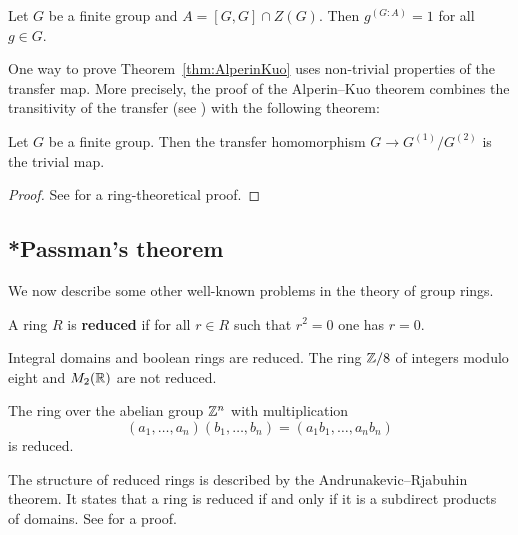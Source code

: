 
\begin{theorem}
\label{thm:AlperinKuo}
Let $G$ be a finite group and $A=[G,G]\cap Z(G)$. Then $g^{(G:A)}=1$ for all $g\in G$. 
\end{theorem}

One way to prove Theorem~\ref{thm:AlperinKuo} uses non-trivial properties of 
the transfer map. More precisely, the proof of the Alperin--Kuo theorem 
combines the transitivity of the transfer (see \cite[Theorem 10.8]{MR2426855}) 
with the following theorem:

\begin{theorem}
\label{thm:Furtwrangler}
    Let $G$ be a finite group. Then the transfer homomorphism 
    $G\to G^{(1)}/G^{(2)}$ is the trivial map. 
\end{theorem}

\begin{proof}
See \cite[Theorem 10.18]{MR2426855} for a ring-theoretical proof. 
\end{proof}

\subsection{*Passman's theorem}

We now describe some other well-known problems
in the theory of group rings.

\begin{definition}
A ring $R$ is \textbf{reduced} if for all $r\in R$ such that 
$r^2=0$ one has $r=0$.
\end{definition}

Integral domains and boolean rings are reduced. The ring $\mathbb{Z}/8$ of integers
modulo eight 
and $M_2(\mathbb{R})$ are not reduced. 

\begin{example}
    The ring over the abelian group $\mathbb{Z}^n$ with multiplication  \[
    (a_1,\dots,a_n)(b_1,\dots,b_n)=(a_1b_1,\dots,a_nb_n)\]
    is reduced. 
\end{example}

The structure of 
reduced rings is described by the 
Andrunakevic--Rjabuhin theorem. It states
that a ring is reduced if and only if
it is a subdirect products of domains. See
\cite[3.20.5]{MR2015465} for a proof. 

